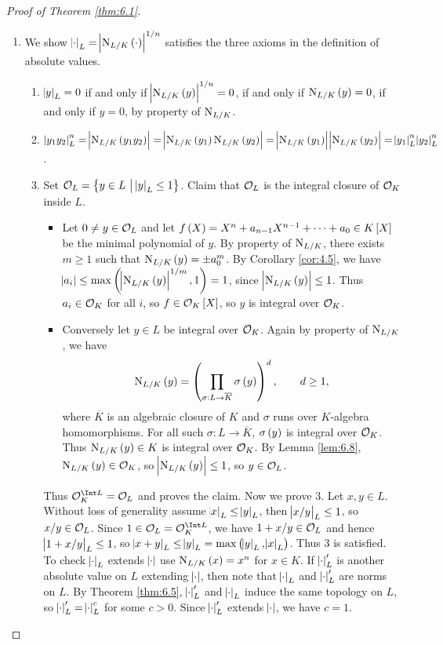 \begin{proof}[Proof of Theorem \ref{thm:6.1}]
\hfill
\begin{enumerate}
\item We show $ \abs{\cdot}_L = \abs{\N_{L / K}\br{\cdot}}^{1 / n} $ satisfies the three axioms in the definition of absolute values.
\begin{enumerate}[label=\arabic*.]
\item $ \abs{y}_L = 0 $ if and only if $ \abs{\N_{L / K}\br{y}}^{1 / n} = 0 $, if and only if $ \N_{L / K}\br{y} = 0 $, if and only if $ y = 0 $, by property of $ \mathrm{N}_{L / K} $.
\item $ \abs{y_1y_2}_L^n = \abs{\N_{L / K}\br{y_1y_2}} = \abs{\N_{L / K}\br{y_1}\N_{L / K}\br{y_2}} = \abs{\N_{L / K}\br{y_1}}\abs{\N_{L / K}\br{y_2}} = \abs{y_1}_L^n\abs{y_2}_L^n $.
\item Set $ \OOO_L = \cbr{y \in L \st \abs{y}_L \le 1} $. Claim that $ \mathcal{O}_L $ is the integral closure of $ \mathcal{O}_K $ inside $ L $.
\begin{itemize}
\item Let $ 0 \ne y \in \mathcal{O}_L $ and let $ f\br{X} = X^n + a_{n - 1}X^{n - 1} + \dots + a_0 \in K\sbr{X} $ be the minimal polynomial of $ y $. By property of $ \mathrm{N}_{L / K} $, there exists $ m \ge 1 $ such that $ \N_{L / K}\br{y} = \pm a_0^m $. By Corollary \ref{cor:4.5}, we have $ \abs{a_i} \le \max\br{\abs{\N_{L / K}\br{y}}^{1 / m}, 1} = 1 $, since $ \abs{\N_{L / K}\br{y}} \le 1 $. Thus $ a_i \in \mathcal{O}_K $ for all $ i $, so $ f \in \OOO_K\sbr{X} $, so $ y $ is integral over $ \mathcal{O}_K $.
\item Conversely let $ y \in L $ be integral over $ \mathcal{O}_K $. Again by property of $ \mathrm{N}_{L / K} $, we have
$$ \N_{L / K}\br{y} = \br{\prod_{\sigma : L \to \overline{K}} \sigma\br{y}}^d, \qquad d \ge 1, $$
where $ \overline{K} $ is an algebraic closure of $ K $ and $ \sigma $ runs over $ K $-algebra homomorphisms. For all such $ \sigma : L \to \overline{K} $, $ \sigma\br{y} $ is integral over $ \mathcal{O}_K $. Thus $ \N_{L / K}\br{y} \in K $ is integral over $ \mathcal{O}_K $. By Lemma \ref{lem:6.8}, $ \N_{L / K}\br{y} \in \OOO_K $, so $ \abs{\N_{L / K}\br{y}} \le 1 $, so $ y \in \mathcal{O}_L $.
\end{itemize}
Thus $ \OOO_K^{\Int L} = \OOO_L $ and proves the claim. Now we prove $ 3 $. Let $ x, y \in L $. Without loss of generality assume $ \abs{x}_L \le \abs{y}_L $, then $ \abs{x / y}_L \le 1 $, so $ x / y \in \mathcal{O}_L $. Since $ 1 \in \OOO_L = \OOO_K^{\Int L} $, we have $ 1 + x / y \in \mathcal{O}_L $ and hence $ \abs{1 + x / y}_L \le 1 $, so $ \abs{x + y}_L \le \abs{y}_L = \max\br{\abs{y}_L, \abs{x}_L} $. Thus $ 3 $ is satisfied. To check $ \abs{\cdot}_L $ extends $ \abs{\cdot} $ use $ \N_{L / K}\br{x} = x^n $ for $ x \in K $. If $ \abs{\cdot}_L' $ is another absolute value on $ L $ extending $ \abs{\cdot} $, then note that $ \abs{\cdot}_L $ and $ \abs{\cdot}_L' $ are norms on $ L $. By Theorem \ref{thm:6.5}, $ \abs{\cdot}_L' $ and $ \abs{\cdot}_L $ induce the same topology on $ L $, so $ \abs{\cdot}_L' = \abs{\cdot}_L^c $ for some $ c > 0 $. Since $ \abs{\cdot}_L' $ extends $ \abs{\cdot} $, we have $ c = 1 $.

\end{enumerate}
\end{enumerate}
\end{proof}
